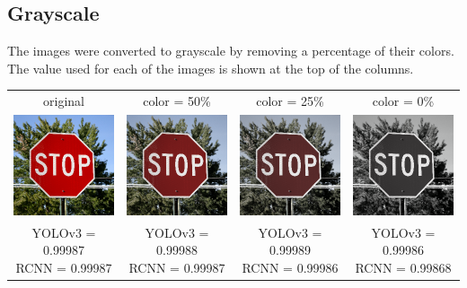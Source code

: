 \documentclass{article}
\begin{document}
\subsection{Grayscale}
The images were converted to grayscale by removing a percentage of their colors. The value used for each of the images is shown at the top of the columns.
\begin{center}
\begin{tabular}{ c c c c }
    original & color = 50\% & color = 25\% & color = 0\% \\
    \includegraphics[width=0.2\linewidth]{../test_images/stop.png} & \includegraphics[width=0.2\linewidth]{../test_images/perturbed/stop_grayscale_0_500.png} & \includegraphics[width=0.2\linewidth]{../test_images/perturbed/stop_grayscale_0_250.png} & \includegraphics[width=0.2\linewidth]{../test_images/perturbed/stop_grayscale_0_010.png} \\
    \makecell{YOLOv3 = 0.99987 \\ RCNN = 0.99987} & \makecell{YOLOv3 = 0.99988 \\ RCNN = 0.99987} & \makecell{YOLOv3 = 0.99989 \\ RCNN = 0.99986} & \makecell{YOLOv3 = 0.99986 \\ RCNN = 0.99868} \\[1cm]

\end{tabular}
\end{center}
\end{document}
